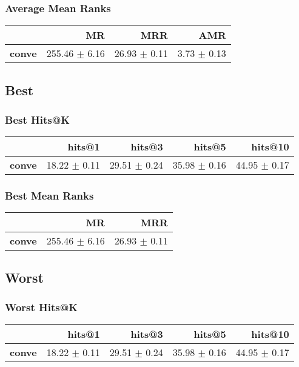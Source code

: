 \documentclass{article}
\begin{document}
    \subsubsection{Average Mean Ranks}
    \begin{center}
    \begin{tabular}{lrrr}
\toprule
{} &             MR &           MRR &          AMR \\
\midrule
\textbf{conve} &  255.46 $\pm$ 6.16 &  26.93 $\pm$ 0.11 &  3.73 $\pm$ 0.13 \\
\bottomrule
\end{tabular}

    \end{center}
    \subsection{Best}
    \subsubsection{Best Hits@K}
    \begin{center}
    \begin{tabular}{lrrrr}
\toprule
{} &        hits@1 &        hits@3 &        hits@5 &       hits@10 \\
\midrule
\textbf{conve} &  18.22 $\pm$ 0.11 &  29.51 $\pm$ 0.24 &  35.98 $\pm$ 0.16 &  44.95 $\pm$ 0.17 \\
\bottomrule
\end{tabular}

    \end{center}
    \subsubsection{Best Mean Ranks}
    \begin{center}
    \begin{tabular}{lrr}
\toprule
{} &             MR &           MRR \\
\midrule
\textbf{conve} &  255.46 $\pm$ 6.16 &  26.93 $\pm$ 0.11 \\
\bottomrule
\end{tabular}

    \end{center}
    \subsection{Worst}
    \subsubsection{Worst Hits@K}
    \begin{center}
    \begin{tabular}{lrrrr}
\toprule
{} &        hits@1 &        hits@3 &        hits@5 &       hits@10 \\
\midrule
\textbf{conve} &  18.22 $\pm$ 0.11 &  29.51 $\pm$ 0.24 &  35.98 $\pm$ 0.16 &  44.95 $\pm$ 0.17 \\
\bottomrule
\end{tabular}

    \end{center}
\end{document}
